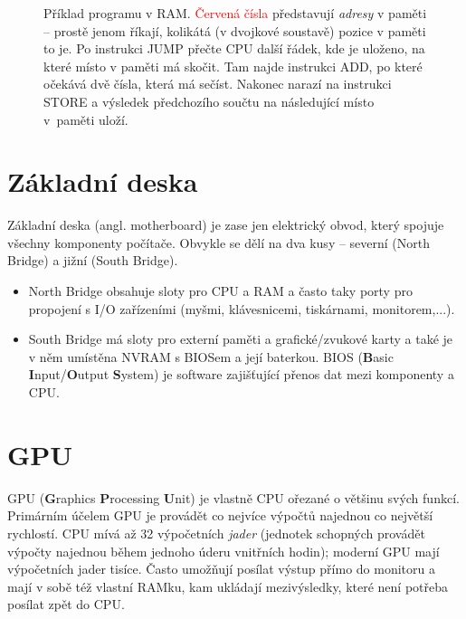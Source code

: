 \documentclass[a4paper,11pt]{article}
\newcommand{\clr}{\textcolor{red}}
\begin{document}
\begin{figure}[ht]
 \centering
 \caption*{Příklad programu v RAM. \clr{Červená čísla} představují \emph{adresy}
  v paměti -- prostě jenom říkají, kolikátá (v dvojkové soustavě) pozice v
  paměti to je. Po instrukci JUMP přečte CPU další řádek, kde je uloženo, na
  které místo v paměti má skočit. Tam najde instrukci ADD, po které očekává dvě
  čísla, která má sečíst. Nakonec narazí na instrukci STORE a výsledek
  předchozího součtu na následující místo v~paměti uloží.}
\end{figure}

\section*{Základní deska}

Základní deska (angl. motherboard) je zase jen elektrický obvod, který spojuje
všechny komponenty počítače. Obvykle se dělí na dva kusy -- severní (North
Bri\-dge) a jižní (South Bridge).
\begin{itemize}
 \item North Bridge obsahuje sloty pro CPU a RAM a často taky porty pro
  propojení s I/O zařízeními (myšmi, klávesnicemi, tiskárnami, monitorem,...).
 \item South Bridge má sloty pro externí paměti a grafické/zvukové karty a také
  je v něm umístěna NVRAM s BIOSem a její baterkou. BIOS (\textbf{B}asic
  \textbf{I}nput/\textbf{O}ut\-put \textbf{S}ystem) je software zajišťující přenos
  dat mezi komponenty a CPU.
\end{itemize}

\section*{GPU}

GPU (\textbf{G}raphics \textbf{P}rocessing \textbf{U}nit) je vlastně CPU ořezané
o většinu svých funkcí. Primárním účelem GPU je provádět co nejvíce výpočtů
najednou co největší rychlostí. CPU mívá až 32 výpočetních \emph{jader}
(jednotek schopných provádět výpočty najednou během jednoho úderu vnitřních
hodin); moderní GPU mají výpočetních jader tisíce. Často umožňují posílat výstup
přímo do monitoru a mají v sobě též vlastní RAMku, kam ukládají mezivýsledky,
které není potřeba posílat zpět do CPU.
\end{document}
